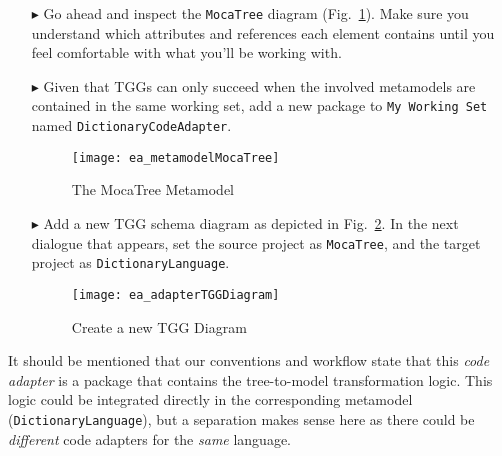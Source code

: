 \begin{itemize}

\item[$\blacktriangleright$] Go ahead and inspect the \texttt{MocaTree} diagram (Fig.~\ref{ea:mocaTree}). Make sure you understand which attributes and
references each element contains until you feel comfortable with what you'll be working with.

\item[$\blacktriangleright$] Given that TGGs can only succeed when the involved metamodels are contained in the same working set, add a new package to
\texttt{My Working Set} named \texttt{Dict\-ion\-ary\-Code\-Adap\-ter}.

\newpage

\begin{figure}[htpb]
\begin{center}
  \texttt{[image: ea\_metamodelMocaTree]}
  \caption{The MocaTree Metamodel}
  \label{ea:mocaTree}
\end{center}
\end{figure}

\vspace{1cm}

\item[$\blacktriangleright$] Add a new TGG schema diagram as depicted in Fig.~\ref{ea:newTGGDiagram}. In the next dialogue that appears, set the source project
as \texttt{MocaTree}, and the target project as \texttt{Dict\-ion\-ary\-Lang\-uage}.

\vspace{1cm}

\begin{figure}[htpb]
\begin{center}
  \texttt{[image: ea\_adapterTGGDiagram]}
  \caption{Create a new TGG Diagram}
  \label{ea:newTGGDiagram}
\end{center}
\end{figure}

\end{itemize}

\clearpage

It should be mentioned that our conventions and workflow state that this \emph{code adapter} is a package that contains the tree-to-model transformation logic.
This logic could be integrated directly in the corresponding metamodel (\texttt{Dic\-tion\-ary\-Language}), but a separation makes sense here as there could be
\emph{different} code adapters for the \emph{same} language.

